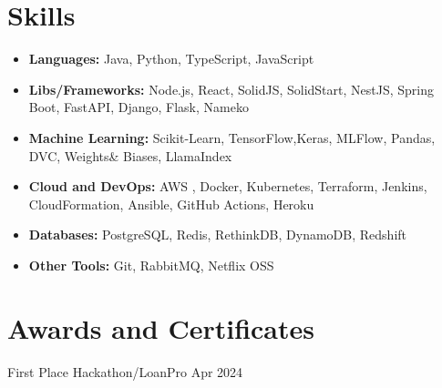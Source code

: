\documentclass{ExpressiveResume}
\begin{document}
\section{Skills}
\begin{itemize}
    \item \textbf{Languages:} Java, Python, TypeScript, JavaScript
    \item \textbf{Libs/Frameworks:} Node.js, React, SolidJS, SolidStart, NestJS, Spring Boot, FastAPI, Django, Flask, Nameko
    \item \textbf{Machine Learning:} Scikit-Learn, TensorFlow,Keras, MLFlow, Pandas, DVC, Weights\& Biases, LlamaIndex
    \item \textbf{Cloud and DevOps:} AWS , Docker, Kubernetes, Terraform, Jenkins, CloudFormation, Ansible, GitHub Actions, Heroku
    \item \textbf{Databases:} PostgreSQL, Redis, RethinkDB, DynamoDB, Redshift
    \item \textbf{Other Tools:} Git, RabbitMQ, Netflix OSS
\end{itemize}

\pagebreak
\section{Awards and Certificates}

\experience
{First Place}
{Hackathon/LoanPro}
{}{Apr 2024}
{
}
\end{document}
